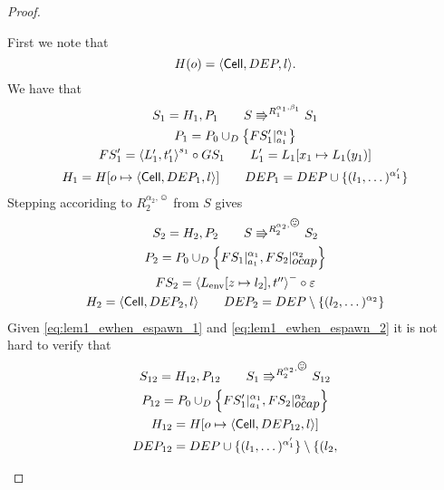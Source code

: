 \begin{proof}
\begin{description}
      First we note that
      \begin{equation}
        H(o) = \mbox{$\langle \mbox{$\mathsf{Cell}$}{}, DEP, l \rangle$}.
      \end{equation}
      We have that 
      \begin{equation} \label{eq:lem1_ewhen_espawn_1}
        \begin{gathered}    %
          S_1 = H_1, P_1 \andalso S \Rrightarrow^{R_1^{\alpha_1, \beta_1}} S_1
          \\
          P_1 = P_0 \cup_D \left\{ FS'_1|_{a_1}^{\alpha_1} \right\} \\
          FS'_1 = \xframe{L'_1, t'_1}^{s_1} \circ GS_1  \andalso L'_1 = L_1[x_1 \mapsto
          L_1(y_1)] \\
          H_1 = H[o \mapsto \Cell{DEP_1, l}] \andalso DEP_1 = DEP \cup \{ (l_1,
          \dots)^{\alpha'_1} \}
        \end{gathered}
      \end{equation}
      Stepping accoriding to $R_2^{\alpha_2, \smiley}$ from $S$ gives
      \begin{equation} \label{eq:lem1_ewhen_espawn_2}
        \begin{gathered}
          S_2 = H_2, P_2 \andalso S \Rrightarrow^{R_2^{\alpha_2, \smiley}} S_2
          \\
          P_2 = P_0 \cup_D \left\{ FS_1|_{a_1}^{\alpha_1},
          FS_2|_{\ocap}^{\alpha_2} \right\} \\
          FS_2 = \xframe{L_{\text{env}}[z \mapsto l_2], t''}^{-} \circ
          \varepsilon \\
          H_2 = \Cell{DEP_2, l} \andalso DEP_2 = DEP \setminus \{ (l_2,
          \dots)^{\alpha_2} \}
        \end{gathered}
      \end{equation}
      Given \eqref{eq:lem1_ewhen_espawn_1} and \eqref{eq:lem1_ewhen_espawn_2} it
      is not hard to verify that
      \begin{equation} 
        \begin{gathered}
          S_{12} = H_{12}, P_{12} \andalso S_1 \Rrightarrow^{R_2^{\alpha_2,
          \smiley}} S_{12}
          \\
          P_{12} = P_0 \cup_D \left\{ FS'_1|_{a_1}^{\alpha_1},
          FS_2|_{\ocap}^{\alpha_2} \right\} \\
          H_{12} = H[o \mapsto \Cell{DEP_{12}, l}] \\ 
          DEP_{12} = DEP \cup \{ (l_1, \dots)^{\alpha'_1} \} \setminus \{ (l_2,

\end{gathered}
\end{equation}
\end{description}
\end{proof}
